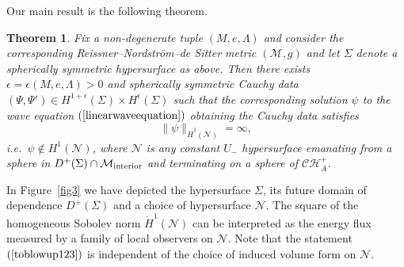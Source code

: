 \documentclass[A4,10pt]{article}
\newtheorem{theorem}{Theorem}[section]
\begin{document}
Our main result is the following theorem.
\begin{theorem}\label{mainresult}
Fix a non-degenerate tuple $(M,e,\Lambda)$ and consider the corresponding 
Reissner--Nordstr\"om--de Sitter metric $(\mathcal{M},g)$ and let $\Sigma$ denote
a spherically symmetric hypersurface as above. 
Then there exists $\epsilon = \epsilon(M,e,\Lambda) > 0$ and spherically symmetric Cauchy data $(\Psi,\Psi') \in H^{1+\epsilon}(\Sigma) \times H^{\epsilon}(\Sigma)$  such that the corresponding solution $\psi$ to the wave equation $(\ref{linearwaveequation})$ obtaining the Cauchy data 
satisfies
\begin{equation}
\label{toblowup123}
\|\psi\|_{\dot H^1(\mathcal{N})}=\infty,
\end{equation}
i.e.~$\psi\not\in H^1(\mathcal{N})$, where $\mathcal{N}$ is any constant $U_-$ hypersurface emanating from a sphere
in $D^+(\Sigma)\cap\mathcal{M}_{\rm interior}$ and terminating on  a sphere of $\mathcal{CH}^+_A$.
\end{theorem}
In Figure~\ref{fig3} we have depicted the hypersurface $\Sigma$, its future domain of 
dependence $D^+(\Sigma)$ and a choice of hypersurface $\mathcal{N}$.
The square of the homogeneous Sobolev norm $\dot H^1(\mathcal{N})$ can be interpreted as the energy flux measured
by a family of local observers on $\mathcal{N}$. Note that the statement $(\ref{toblowup123})$
is independent of the choice of induced volume form on $\mathcal{N}$.
\end{document}
